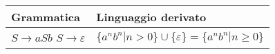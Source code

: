 \documentclass{standalone}
\begin{document}
\begin{tabularx}{\textwidth}{|X |X |}
	\toprule
		Grammatica & Linguaggio derivato \\
    \hline
        $S \to aSb$ \newline
        $S \to \varepsilon$
        & 
        $\{a^nb^n | n>0\} \cup \{\varepsilon\} = \{a^nb^n | n \ge 0\}$ 
        \\
    \bottomrule
\end{tabularx}
\end{document}
